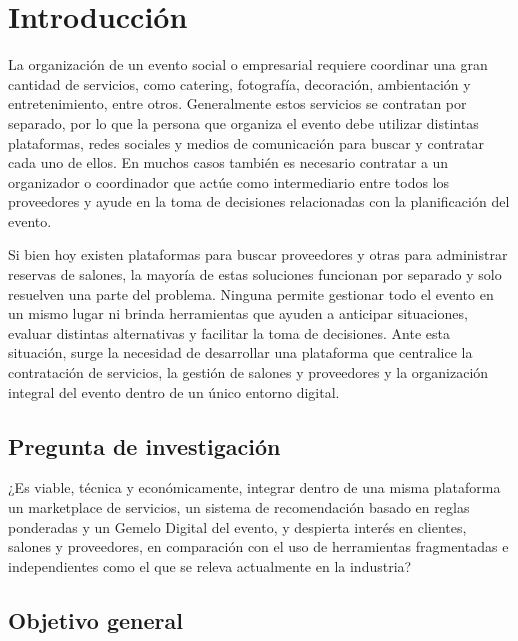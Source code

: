 
\chapter{Introducción}\label{cap:introduccion}

La organización de un evento social o empresarial requiere coordinar una
gran cantidad de servicios, como catering, fotografía, decoración,
ambientación y entretenimiento, entre otros. Generalmente estos servicios
se contratan por separado, por lo que la persona que organiza el evento
debe utilizar distintas plataformas, redes sociales y medios de
comunicación para buscar y contratar cada uno de ellos. En muchos casos
también es necesario contratar a un organizador o coordinador que actúe
como intermediario entre todos los proveedores y ayude en la toma de
decisiones relacionadas con la planificación del evento.

Si bien hoy existen plataformas para buscar proveedores y otras para
administrar reservas de salones, la mayoría de estas soluciones funcionan
por separado y solo resuelven una parte del problema. Ninguna permite
gestionar todo el evento en un mismo lugar ni brinda herramientas que
ayuden a anticipar situaciones, evaluar distintas alternativas y facilitar
la toma de decisiones. Ante esta situación, surge la necesidad de
desarrollar una plataforma que centralice la contratación de servicios, la
gestión de salones y proveedores y la organización integral del evento
dentro de un único entorno digital.

\section{Pregunta de investigación}

¿Es viable, técnica y económicamente, integrar dentro de una misma
plataforma un marketplace de servicios, un sistema de recomendación
basado en reglas ponderadas y un Gemelo Digital del evento, y despierta
interés en clientes, salones y proveedores, en comparación con el uso de
herramientas fragmentadas e independientes como el que se releva
actualmente en la industria?

\section{Objetivo general}

